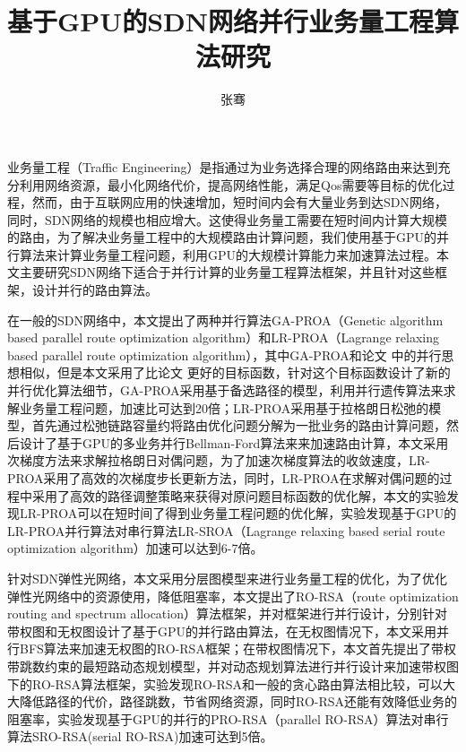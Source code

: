 \documentclass[master]{thesis-uestc}
\title{基于GPU的SDN网络并行业务量工程算法研究}
\author{张骞}
\begin{document}
\begin{chineseabstract}
业务量工程（Traffic Engineering）是指通过为业务选择合理的网络路由来达到充分利用网络资源，最小化网络代价，提高网络性能，满足Qos需要等目标的优化过程，然而，由于互联网应用的快速增加，短时间内会有大量业务到达SDN网络，同时，SDN网络的规模也相应增大。这使得业务量工需要在短时间内计算大规模的路由，为了解决业务量工程中的大规模路由计算问题，我们使用基于GPU的并行算法来计算业务量工程问题，利用GPU的大规模计算能力来加速算法过程。本文主要研究SDN网络下适合于并行计算的业务量工程算法框架，并且针对这些框架，设计并行的路由算法。

在一般的SDN网络中，本文提出了两种并行算法GA-PROA（Genetic algorithm based parallel route optimization algorithm）和LR-PROA（Lagrange relaxing based parallel route optimization algorithm），其中GA-PROA和论文 中的并行思想相似，但是本文采用了比论文 更好的目标函数，针对这个目标函数设计了新的并行优化算法细节，GA-PROA采用基于备选路径的模型，利用并行遗传算法来求解业务量工程问题，加速比可达到20倍；LR-PROA采用基于拉格朗日松弛的模型，首先通过松弛链路容量约将路由优化问题分解为一批业务的路由计算问题，然后设计了基于GPU的多业务并行Bellman-Ford算法来来加速路由计算，本文采用次梯度方法来求解拉格朗日对偶问题，为了加速次梯度算法的收敛速度，LR-PROA采用了高效的次梯度步长更新方法，同时，LR-PROA在求解对偶问题的过程中采用了高效的路径调整策略来获得对原问题目标函数的优化解，本文的实验发现LR-PROA可以在短时间了得到业务量工程问题的优化解，实验发现基于GPU的LR-PROA并行算法对串行算法LR-SROA（Lagrange relaxing based serial route optimization algorithm）加速可以达到6-7倍。

针对SDN弹性光网络，本文采用分层图模型来进行业务量工程的优化，为了优化弹性光网络中的资源使用，降低阻塞率，本文提出了RO-RSA（route optimization routing and spectrum allocation）算法框架，并对框架进行并行设计，分别针对带权图和无权图设计了基于GPU的并行路由算法，在无权图情况下，本文采用并行BFS算法来加速无权图的RO-RSA框架；在带权图情况下，本文首先提出了带权带跳数约束的最短路动态规划模型，并对动态规划算法进行并行设计来加速带权图下的RO-RSA算法框架，实验发现RO-RSA和一般的贪心路由算法相比较，可以大大降低路径的代价，路径跳数，节省网络资源，同时RO-RSA还能有效降低业务的阻塞率，实验发现基于GPU的并行的PRO-RSA（parallel RO-RSA）算法对串行算法SRO-RSA(serial RO-RSA)加速可达到5倍。

\end{chineseabstract}
\end{document}
